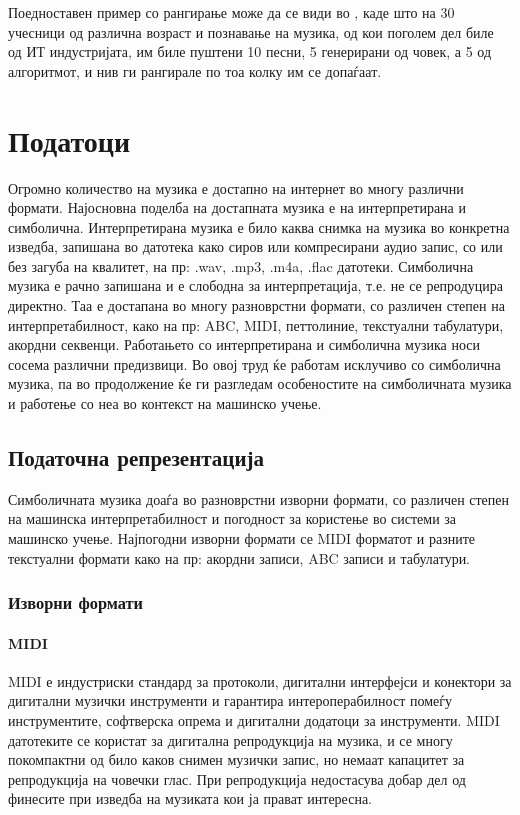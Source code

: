 Поедноставен пример со рангирање може да се види во \cite{GarciaSalas2011}, каде што на 30 учесници од различна возраст и познавање на музика, од кои поголем дел биле од ИТ индустријата, им биле пуштени 10 песни, 5 генерирани од човек, а 5 од алгоритмот, и нив ги рангирале по тоа колку им се допаѓаат.

\chapter{Податоци}
\label{ch:podatoci}

Огромно количество на музика е достапно на интернет во многу различни формати. Најосновна поделба на достапната музика е на интерпретирана и симболична. Интерпретирана музика е било каква снимка на музика во конкретна изведба, запишана во датотека како сиров или компресирани аудио запис, со или без загуба на квалитет, на пр: .wav, .mp3, .m4a, .flac датотеки. Симболична музика е рачно запишана и е слободна за интерпретација, т.е. не се репродуцира директно. Таа е достапана во многу разноврстни формати, со различен степен на интерпретабилност, како на пр: ABC, MIDI, петтолиние, текстуални табулатури, акордни секвенци.
Работањето со интерпретирана и симболична музика носи сосема различни предизвици. Во овој труд ќе работам исклучиво со симболична музика, па во продолжение ќе ги разгледам особеностите на симболичната музика и работење со неа во контекст на машинско учење.

\section{Податочна репрезентација}

Симболичната музика доаѓа во разноврстни изворни формати, со различен степен на машинска интерпретабилност и погодност за користење во системи за машинско учење. Најпогодни изворни формати се MIDI форматот и разните текстуални формати како на пр: акордни записи, ABC записи и табулатури. 

\subsection{Изворни формати}

\subsubsection{MIDI}

MIDI е индустриски стандард за протоколи, дигитални интерфејси и конектори за дигитални музички инструменти и гарантира интероперабилност помеѓу инструментите, софтверска опрема и дигитални додатоци за инструменти. MIDI датотеките се користат за дигитална репродукција на музика, и се многу покомпактни од било каков снимен музички запис, но немаат капацитет за репродукција на човечки глас. При репродукција недостасува добар дел од финесите при изведба на музиката кои ја прават интересна.

